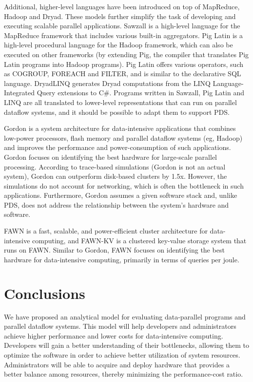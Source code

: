 \documentclass[ 11pt, letterpaper]{article}%
\begin{document}
Additional, higher-level languages have been introduced on top of MapReduce,
Hadoop and Dryad. These models further simplify the task of developing and
executing scalable parallel applications. Sawzall \cite{sawzall} is a
high-level language for the MapReduce framework that includes various built-in
aggregators. Pig Latin \cite{piglatin} is a high-level procedural language for
the Hadoop framework, which can also be executed on other frameworks (by
extending Pig, the compiler that translates Pig Latin programs into Hadoop
programs). Pig Latin offers various operators, such as COGROUP, FOREACH and
FILTER, and is similar to the declarative SQL language. DryadLINQ
\cite{dryadlinq} generates Dryad computations from the LINQ Language-Integrated
Query extensions to C\#. Programs written in Sawzall, Pig Latin and LINQ are
all translated to lower-level representations that can run on parallel dataflow
systems, and it should be possible to adapt them to support PDS.

Gordon \cite{gordon} is a system architecture for data-intensive applications
that combines low-power processors, flash memory and parallel dataflow systems
(eg, Hadoop) and improves the performance and power-consumption of such
applications. Gordon focuses on identifying the best hardware for large-scale
parallel processing. According to trace-based simulations (Gordon is not an
actual system), Gordon can outperform disk-based clusters by 1.5x. However, the
simulations do not account for networking, which is often the bottleneck in
such applications. Furthermore, Gordon assumes a given software stack and,
unlike PDS, does not address the relationship between the system's hardware and
software.

FAWN \cite{fawn} is a fast, scalable, and power-efficient cluster architecture
for data-intensive computing, and FAWN-KV is a clustered key-value
storage system that runs on FAWN. Similar to Gordon, FAWN focuses on identifying
the best hardware for data-intensive computing, primarily in terms of queries
per joule.

\section{Conclusions}

We have proposed an analytical model for evaluating data-parallel programs and
parallel dataflow systems. This model will help developers and administrators
achieve higher performance and lower costs for data-intensive computing.
Developers will gain a better understanding of their bottlenecks, allowing them
to optimize the software in order to achieve better utilization of system
resources. Administrators will be able to acquire and deploy hardware that
provides a better balance among resources, thereby minimizing the
performance-cost ratio.
\end{document}

